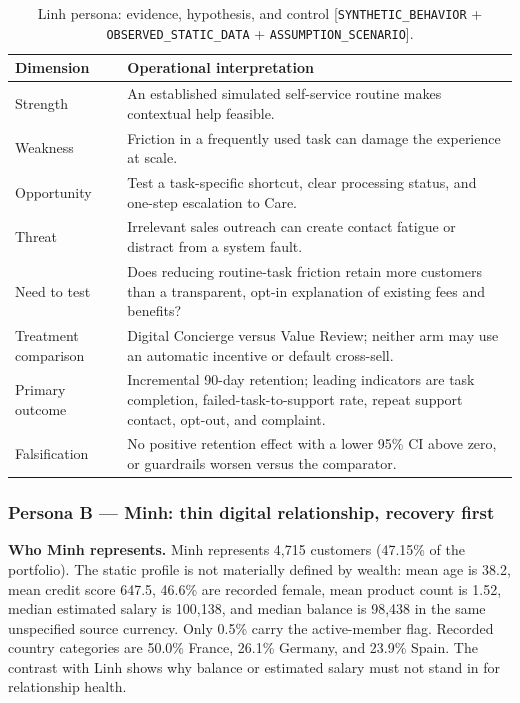\documentclass[a4paper,12pt]{article}
\newcommand{\observed}{\texttt{OBSERVED\_STATIC\_DATA}}
\newcommand{\synthetic}{\texttt{SYNTHETIC\_BEHAVIOR}}
\newcommand{\scenario}{\texttt{ASSUMPTION\_SCENARIO}}
\begin{document}
\begin{table}[H]
\centering
\caption{Linh persona: evidence, hypothesis, and control [\synthetic{} + \observed{} + \scenario].}
\label{tab:linh-persona}
\small
\begin{tabularx}{\textwidth}{P{0.20\textwidth}Y}
\toprule
\textbf{Dimension} & \textbf{Operational interpretation}\\
\midrule
Strength & An established simulated self-service routine makes contextual help feasible.\\
Weakness & Friction in a frequently used task can damage the experience at scale.\\
Opportunity & Test a task-specific shortcut, clear processing status, and one-step escalation to Care.\\
Threat & Irrelevant sales outreach can create contact fatigue or distract from a system fault.\\
Need to test & Does reducing routine-task friction retain more customers than a transparent, opt-in explanation of existing fees and benefits?\\
Treatment comparison & Digital Concierge versus Value Review; neither arm may use an automatic incentive or default cross-sell.\\
Primary outcome & Incremental 90-day retention; leading indicators are task completion, failed-task-to-support rate, repeat support contact, opt-out, and complaint.\\
Falsification & No positive retention effect with a lower 95\% CI above zero, or guardrails worsen versus the comparator.\\
\bottomrule
\end{tabularx}
\end{table}

\subsubsection{Persona B --- Minh: thin digital relationship, recovery first}

\textbf{Who Minh represents.} Minh represents 4,715 customers (47.15\% of the portfolio). The static profile is not materially defined by wealth: mean age is 38.2, mean credit score 647.5, 46.6\% are recorded female, mean product count is 1.52, median estimated salary is 100,138, and median balance is 98,438 in the same unspecified source currency. Only 0.5\% carry the active-member flag. Recorded country categories are 50.0\% France, 26.1\% Germany, and 23.9\% Spain. The contrast with Linh shows why balance or estimated salary must not stand in for relationship health.
\end{document}
